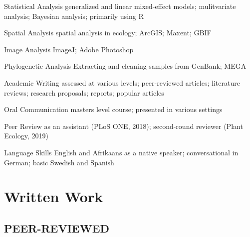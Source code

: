 \documentclass[11pt, a4paper]{awesome-cv}
\newcounter{papers}
\begin{document}
\begin{cvskills}
  \cvskill
    {Statistical Analysis}
    {generalized and linear mixed-effect models; mulitvariate analysis; Bayesian analysis; primarily using R}

  \cvskill
    {Spatial Analysis}
    {spatial analysis in ecology; ArcGIS; Maxent; GBIF}
    
  \cvskill
    {Image Analysis}
    {ImageJ; Adobe Photoshop}
    
  \cvskill
    {Phylogenetic Analysis}
    {Extracting and cleaning samples from GenBank; MEGA}
    
  \cvskill
    {Academic Writing}
    {assessed at various levels; peer-reviewed articles; literature reviews; research proposals; reports; popular articles}

  \cvskill
    {Oral Communication}
    {masters level course; presented in various settings}

  \cvskill
    {Peer Review}
    {as an assistant (PLoS ONE, 2018); second-round reviewer (Plant Ecology, 2019)}

  \cvskill
    {Language Skills}
    {English and Afrikaans as a native speaker; conversational in German; basic Swedish and Spanish}

\end{cvskills}

\hypertarget{written-work}{%
\section{Written Work}\label{written-work}}

\hypertarget{peer-reviewed}{%
\subsection{PEER-REVIEWED}\label{peer-reviewed}}

\newrefcontext[sorting=none]\setcounter{papers}{0}\pagebreak[3]
\printbibliography[category=bib-/Users/tanyastrydom/Documents/Uni/Admin_Docs/CV/pubs.bib-2419998,heading=none]\setcounter{papers}{0}

\nocite{Kattge_2020,
Kattge_2020:1,
Kattge_2020:2,
Kattge_2020:3,
Kattge_2020:4,
Kattge_2020:5,
Kattge_2020:6}
\end{document}
